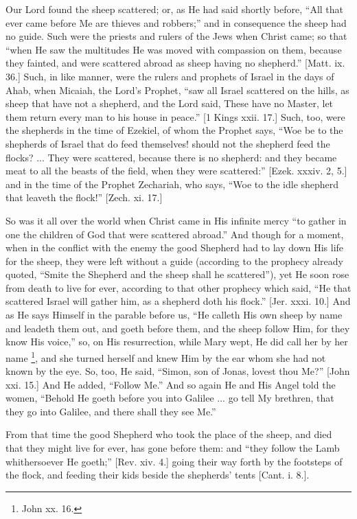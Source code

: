 Our Lord found the sheep scattered; or, as He had said shortly
before, ``All that ever came before Me are thieves and
robbers;'' and in consequence the sheep had no guide. Such were
the priests and rulers of the Jews when Christ came; so that
``when He saw the multitudes He was moved with compassion on them,
because they fainted, and were scattered abroad as sheep having no
shepherd.'' [Matt. ix. 36.] Such, in like manner, were the rulers
and prophets of Israel in the days of Ahab, when Micaiah, the Lord's
Prophet, ``saw all Israel scattered on the hills, as sheep that
have not a shepherd, and the Lord said, These have no Master, let them
return every man to his house in peace.'' [1 Kings xxii. 17.]
Such, too, were the shepherds in the time of Ezekiel, of whom the
Prophet says, ``Woe be to the shepherds of Israel that do feed
themselves! should not the shepherd feed the flocks? ... They were
scattered, because there is no shepherd: and they became meat to all
the beasts of the field, when they were scattered:'' [Ezek. xxxiv.
2, 5.] and in the time of the Prophet Zechariah, who says, ``Woe
to the idle shepherd that leaveth the flock!'' [Zech. xi. 17.]

So was it all over the world when Christ came in His infinite mercy
``to gather in one the children of God that were scattered
abroad.'' And though for a moment, when in the conflict with the
enemy the good Shepherd had to lay down His life for the sheep, they
were left without a guide (according to the prophecy already quoted,
``Smite the Shepherd and the sheep shall he scattered''), yet
He soon rose from death to live for ever, according to that other
prophecy which said, ``He that scattered Israel will gather him,
as a shepherd doth his flock.'' [Jer. xxxi. 10.] And as He says
Himself in the parable before us, ``He calleth His own sheep by
name and leadeth them out, and goeth before them, and the sheep follow
Him, for they know His voice,'' so, on His resurrection, while
Mary wept, He did call her by her name \footnote{John xx. 16.}, and she turned
herself and knew Him by the ear whom she had not known by the eye. So,
too, He said, ``Simon, son of Jonas, lovest thou Me?'' [John
xxi. 15.] And He added, ``Follow Me.'' And so again He and His
Angel told the women, ``Behold He goeth before you into Galilee
... go tell My brethren, that they go into Galilee, and there shall
they see Me.''

From that time the good Shepherd who took the place of the sheep,
and died that they might live for ever, has gone before them: and
``they follow the Lamb whithersoever He goeth;'' [Rev. xiv.
4.] going their way forth by the footsteps of the flock, and feeding
their kids beside the shepherds' tents [Cant. i. 8.].

